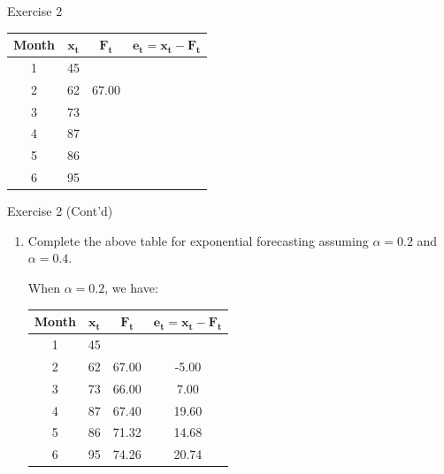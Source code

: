 \documentclass[
  ignorenonframetext,
  aspectratio=43,
]{beamer}
\let\olditem\item
\renewcommand\item{\olditem\justifying}
\begin{document}
\begin{frame}{Exercise 2}
\protect\hypertarget{exercise-2}{}
\begin{table}[h!]
\centering
\begin{tabular}{c c c c}
\toprule
\textbf{Month} & $\mathbf{x_t}$ & $\mathbf{F_t}$ & $\mathbf{e_t = x_t - F_t}$ \\
\midrule
1 & 45 &        &        \\
2 & 62 & 67.00  &        \\
3 & 73 &        &        \\
4 & 87 &        &        \\
5 & 86 &        &        \\
6 & 95 &        &        \\
\bottomrule
\end{tabular}
\end{table}
\end{frame}

\begin{frame}{Exercise 2 (Cont'd)}
\protect\hypertarget{exercise-2-contd}{}
\begin{enumerate}
\item
  Complete the above table for exponential forecasting assuming
  \(\alpha = 0.2\) and \(\alpha = 0.4\).

  \pause

  When \(\alpha = 0.2\), we have: \vspace{0.25cm}

  \pause

  \begin{table}[h!]
   \centering
   \begin{tabular}{c c c c}
   \toprule
   Month & $\mathbf{x_t}$ & $\mathbf{F_t}$ & $\mathbf{e_t = x_t - F_t}$ \\
   \midrule
   1 & 45 &        &        \\
   2 & 62 & 67.00  & -5.00  \\
   3 & 73 & 66.00  & 7.00   \\
   4 & 87 & 67.40  & 19.60  \\
   5 & 86 & 71.32  & 14.68  \\
   6 & 95 & 74.26  & 20.74  \\
   \bottomrule
   \end{tabular}
   \end{table}
\end{enumerate}
\end{frame}
\end{document}
